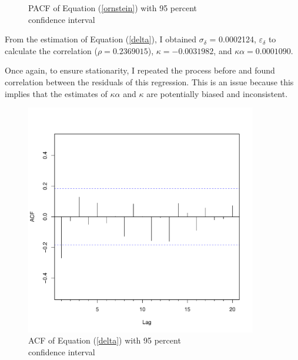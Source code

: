 \documentclass{paper}
\let\oldref\ref
\renewcommand{\ref}[1]{(\oldref{#1})}
\begin{document}
\begin{doublespacing}
\begin{figure}[H]
\begin{minipage}{0.5\textwidth}
       \caption{PACF of Equation \ref{ornstein} with 95 percent\\ confidence interval}\label{pSpot}
    \end{minipage}
\end{figure}

From the estimation of Equation \ref{delta}, I obtained $\sigma_{\delta}$ = 0.0002124, $\varepsilon_{\delta}$ to calculate the correlation ($\rho = 0.2369015$), $\kappa = -0.0031982$, and $\kappa\alpha = 0.0001090$.

Once again, to ensure stationarity, I repeated the process before and found correlation between the residuals of this regression. This is an issue because this implies that the estimates of $\kappa\alpha$ and $\kappa$ are potentially biased and inconsistent.
\begin{figure}[H]
    \centering
    \begin{minipage}{0.5\textwidth}
        \centering
        \includegraphics[width=0.9\textwidth]{acfCon.pdf} %
        \caption{ACF of Equation \ref{delta} with 95 percent\\ confidence interval}\label{aCon}
    \end{minipage}\hfill
    \begin{minipage}{0.5\textwidth}
        \centering

\end{minipage}
\end{figure}
\end{doublespacing}
\end{document}
